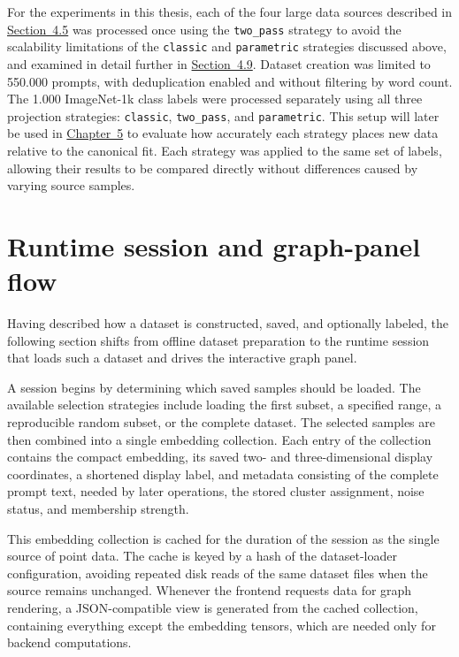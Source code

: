 For the experiments in this thesis, each of the four large data sources described in \hyperref[sec:4.5]{Section~4.5} was processed once using the \texttt{two\_pass} strategy to avoid the scalability limitations of the \texttt{classic} and \texttt{parametric} strategies discussed above, and examined in detail further in \hyperref[sec:4.9]{Section~4.9}. Dataset creation was limited to 550.000 prompts, with deduplication enabled and without filtering by word count. The 1.000 ImageNet-1k class labels were processed separately using all three projection strategies: \texttt{classic}, \texttt{two\_pass}, and \texttt{parametric}. This setup will later be used in \hyperref[ch:results]{Chapter~5} to evaluate how accurately each strategy places new data relative to the canonical fit. Each strategy was applied to the same set of labels, allowing their results to be compared directly without differences caused by varying source samples.

\section{Runtime session and graph-panel flow}\label{sec:4.7}

Having described how a dataset is constructed, saved, and optionally labeled, the following section shifts from offline dataset preparation to the runtime session that loads such a dataset and drives the interactive graph panel.

A session begins by determining which saved samples should be loaded. The available selection strategies include loading the first subset, a specified range, a reproducible random subset, or the complete dataset. The selected samples are then combined into a single embedding collection. Each entry of the collection contains the compact embedding, its saved two- and three-dimensional display coordinates, a shortened display label, and metadata consisting of the complete prompt text, needed by later operations, the stored cluster assignment, noise status, and membership strength.

This embedding collection is cached for the duration of the session as the single source of point data. The cache is keyed by a hash of the dataset-loader configuration, avoiding repeated disk reads of the same dataset files when the source remains unchanged. Whenever the frontend requests data for graph rendering, a JSON-compatible view is generated from the cached collection, containing everything except the embedding tensors, which are needed only for backend computations.

